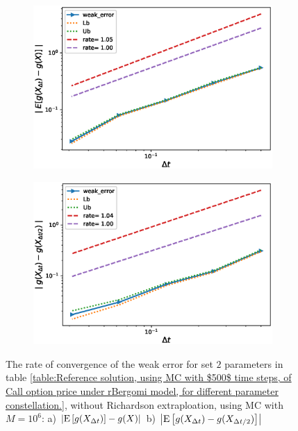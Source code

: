 \documentclass[11pt]{article}
\newcommand{\expt}[1]{\mathrm{E}\left[#1\right]}
\begin{document}
\begin{figure}[h!]
	\centering
	\begin{subfigure}{.4\textwidth}
		\centering
		\includegraphics[width=1\linewidth]{./figures/rBergomi_weak_error_rates/without_richardson/H_007/weak_convergence_order_Bergomi_H_007_K_1_M_10_6_CI_relative}
		\caption{}
		\label{fig:sub3}
	\end{subfigure}%
	\begin{subfigure}{.4\textwidth}
		\centering
		\includegraphics[width=1\linewidth]{./figures/rBergomi_weak_error_rates/without_richardson/H_007/weak_convergence_order_differences_Bergomi_H_007_K_1_M_10_6_CI_relative}
		\caption{}
		\label{fig:sub4}
	\end{subfigure}
	
	\caption{The rate of convergence of the weak error for set $2$ parameters in table \ref{table:Reference solution, using MC with $500$ time steps, of Call option price under rBergomi model, for different parameter constellation.}, without Richardson extraploation, using MC with $M=10^6$: a) $\abs{\expt{g(X_{\Delta t})}-g(X)}$  b) $\abs{\expt{g(X_{\Delta t})-g(X_{\Delta t/2})}}$ }
	\label{fig:Weak_rate_H_007_without_rich}
\end{figure}
\end{document}
